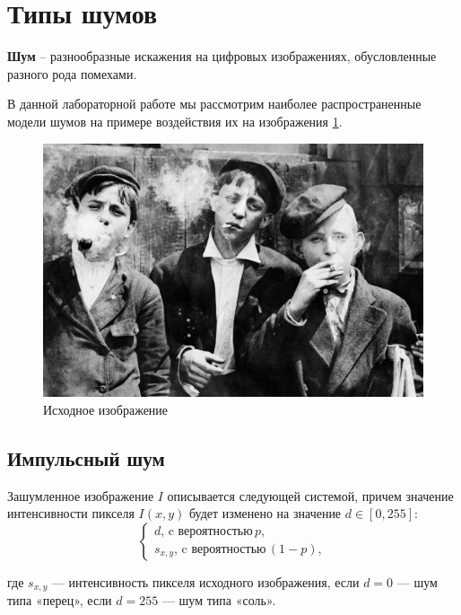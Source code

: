 \section{Типы шумов}

\textbf{Шум} -- разнообразные искажения на цифровых изображениях, обусловленные разного рода помехами.

В данной лабораторной работе мы рассмотрим наиболее распространенные модели шумов на примере воздействия их на изображения \ref{img:source}. 

\begin{figure}[ht!]
    \centering
    \includegraphics[width=\textwidth]{../lewis-hine-taschen-main-3.jpg}
    \caption{Исходное изображение}
    \label{img:source}  
\end{figure}
\FloatBarrier

\subsection{Импульсный шум}
Зашумленное изображение $I$ описывается следующей системой, причем значение интенсивности пикселя $I(x,y)$ будет изменено на значение $d \in [0,255]$:
\begin{equation}
    \begin{cases} d,\, \text{c вероятностью}\, p, \\
    s_{x,y},\, \text{c вероятностью}\, (1-p),
    \end{cases}
\end{equation}

где $s_{x,y}$ — интенсивность пикселя исходного изображения, если $d = 0$ — шум типа «перец», если
$d = 255$ — шум типа «соль».

